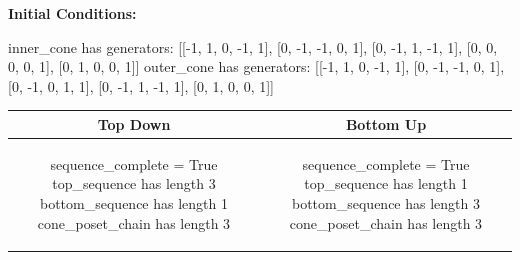 \documentclass[10pt]{article}
\begin{document}
\textbf{Initial Conditions:}
\begin{SAGE}
inner_cone has generators: 
[[-1, 1, 0, -1, 1], [0, -1, -1, 0, 1], [0, -1, 1, -1, 1], [0, 0, 0, 0, 1], [0, 1, 0, 0, 1]]
outer_cone has generators: 
[[-1, 1, 0, -1, 1], [0, -1, -1, 0, 1], [0, -1, 0, 1, 1], [0, -1, 1, -1, 1], [0, 1, 0, 0, 1]]

\end{SAGE}
\begin{tabular}{c|c}
\textbf{Top Down} & \textbf{Bottom Up} \\ \hline  
\begin{SAGE}
sequence_complete = True
top_sequence has length 3
bottom_sequence has length 1
cone_poset_chain has length 3
\end{SAGE} 
&
\begin{SAGE}
sequence_complete = True
top_sequence has length 1
bottom_sequence has length 3
cone_poset_chain has length 3
\end{SAGE} 
\\ \hline


\end{tabular}
\end{document}
